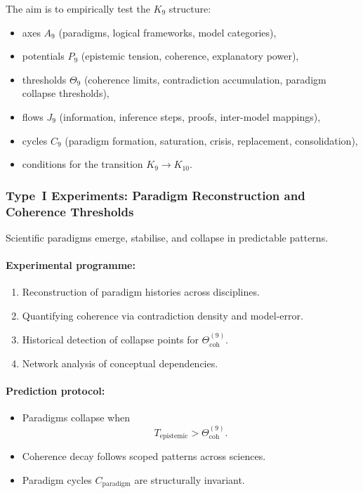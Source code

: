 The aim is to empirically test the $K_9$ structure:

\begin{itemize}
    \item axes $A_9$ (paradigms, logical frameworks, model categories),
    \item potentials $P_9$ (epistemic tension, coherence, explanatory power),
    \item thresholds $\Theta_9$ (coherence limits, contradiction accumulation,
          paradigm collapse thresholds),
    \item flows $J_9$ (information, inference steps, proofs,
          inter-model mappings),
    \item cycles $C_9$ (paradigm formation, saturation, crisis,
          replacement, consolidation),
    \item conditions for the transition $K_9 \to K_{10}$.
\end{itemize}



\subsubsection{Type~I Experiments: Paradigm Reconstruction and Coherence Thresholds}

Scientific paradigms emerge, stabilise, and collapse in
predictable patterns.

\paragraph{Experimental programme:}

\begin{enumerate}
    \item Reconstruction of paradigm histories across disciplines.
    \item Quantifying coherence via contradiction density and model-error.
    \item Historical detection of collapse points for
          $\Theta_{\mathrm{coh}}^{(9)}$.
    \item Network analysis of conceptual dependencies.
\end{enumerate}

\paragraph{Prediction protocol:}

\begin{itemize}
    \item Paradigms collapse when
          \[
              T_{\mathrm{epistemic}} > \Theta_{\mathrm{coh}}^{(9)}.
          \]
    \item Coherence decay follows scoped patterns across sciences.
    \item Paradigm cycles $C_{\mathrm{paradigm}}$ are structurally invariant.
\end{itemize}



